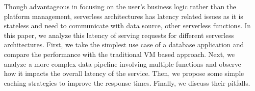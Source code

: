 
Though advantageous in focusing on the user's business logic rather than the platform management, serverless architectures has latency related issues as it is stateless and need to communicate with data source, other serverless functions. In this paper, we analyze this latency of serving requests for different serverless architectures. First, we take the simplest use case of a database application and compare the performance with the traditional VM based approach. Next, we analyze a more complex data pipeline involving multiple functions and observe how it impacts the overall latency of the service. Then, we propose some simple caching strategies to improve the response times. Finally, we discuss their pitfalls.


